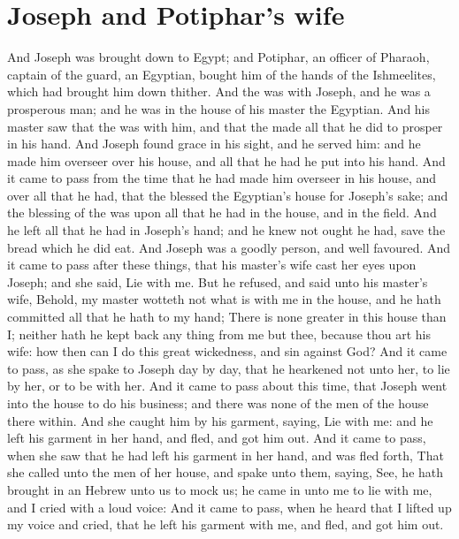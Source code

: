 \section*{Joseph and Potiphar's wife}
\begin{biblechapter} %
\verse And Joseph was brought down to Egypt; and Potiphar, an officer of Pharaoh, captain of the guard, an Egyptian, bought him of the hands of the Ishmeelites, which had brought him down thither.
\verse And the \LORD was with Joseph, and he was a prosperous man; and he was in the house of his master the Egyptian.
\verse And his master saw that the \LORD was with him, and that the \LORD made all that he did to prosper in his hand.
\verse And Joseph found grace in his sight, and he served him: and he made him overseer over his house, and all that he had he put into his hand.
\verse And it came to pass from the time that he had made him overseer in his house, and over all that he had, that the \LORD blessed the Egyptian's house for Joseph's sake; and the blessing of the \LORD was upon all that he had in the house, and in the field.
\verse And he left all that he had in Joseph's hand; and he knew not ought he had, save the bread which he did eat. And Joseph was a goodly person, and well favoured.
\verse And it came to pass after these things, that his master's wife cast her eyes upon Joseph; and she said, Lie with me.
\verse But he refused, and said unto his master's wife, Behold, my master wotteth not what is with me in the house, and he hath committed all that he hath to my hand;
\verse There is none greater in this house than I; neither hath he kept back any thing from me but thee, because thou art his wife: how then can I do this great wickedness, and sin against God?
\verse And it came to pass, as she spake to Joseph day by day, that he hearkened not unto her, to lie by her, or to be with her.
\verse And it came to pass about this time, that Joseph went into the house to do his business; and there was none of the men of the house there within.
\verse And she caught him by his garment, saying, Lie with me: and he left his garment in her hand, and fled, and got him out.
\verse And it came to pass, when she saw that he had left his garment in her hand, and was fled forth,
\verse That she called unto the men of her house, and spake unto them, saying, See, he hath brought in an Hebrew unto us to mock us; he came in unto me to lie with me, and I cried with a loud voice:
\verse And it came to pass, when he heard that I lifted up my voice and cried, that he left his garment with me, and fled, and got him out.

\end{biblechapter}
